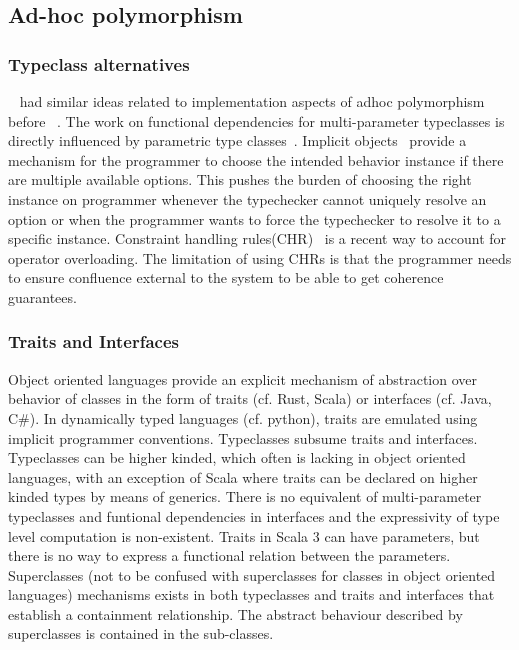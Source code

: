 \documentclass[screen,nonacm,manuscript,review]{acmart} %
\begin{document}
\subsection{Ad-hoc polymorphism}\label{sec:rw-adhoc-poly}
\subsubsection{Typeclass alternatives}
~\citet{kaes_parametric_1988} had similar ideas related to
implementation aspects of adhoc polymorphism before
~\citet{wadler_polymorphism_1989}. The work on functional dependencies
for multi-parameter typeclasses is directly influenced by parametric
type classes~\cite{chen_parametric_1992}. Implicit
objects~\cite{oliveira_typeclasses_2010} provide a mechanism for the
programmer to choose the intended behavior instance if
there are multiple available options. This pushes the burden of choosing the
right instance on programmer whenever the typechecker cannot uniquely
resolve an option or when the programmer wants to force the
typechecker to resolve it to a specific instance. Constraint handling
rules(CHR)~\cite{fruhwirth_theory_1998,stuckey_theory_2005} is a recent
way to account for operator overloading. The limitation of using CHRs
is that the programmer needs to ensure confluence external to the
system to be able to get coherence guarantees.

\subsubsection{Traits and Interfaces}
Object oriented languages provide an explicit mechanism of abstraction
over behavior of classes in the form of traits (cf. Rust, Scala) or
interfaces (cf. Java, C\#). In dynamically typed languages
(cf. python), traits are emulated using implicit programmer
conventions. Typeclasses subsume traits and interfaces. Typeclasses
can be higher kinded, which often is lacking in object oriented
languages, with an exception of Scala where traits can be declared on
higher kinded types by means of generics. There is no equivalent of
multi-parameter typeclasses and funtional dependencies in interfaces
and the expressivity of type level computation is non-existent. Traits
in Scala 3 can have parameters, but there is no way to express a
functional relation between the parameters. Superclasses (not to be
confused with superclasses for classes in object oriented languages)
mechanisms exists in both typeclasses and traits and interfaces that
establish a containment relationship. The abstract behaviour described
by superclasses is contained in the sub-classes.
\end{document}
